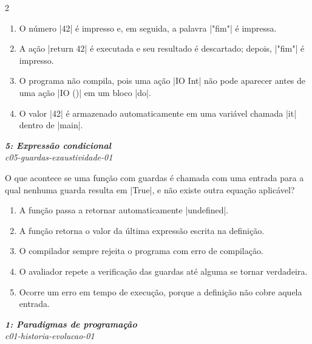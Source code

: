 \documentclass[a4paper,10pt,brazil]{article}
\begin{document}
\begin{multicols}{2}
\begin{enumerate}
  \item O número \haskellinline|42| é impresso e, em seguida, a palavra \haskellinline|"fim"| é impressa.

  \item A ação \haskellinline|return 42| é executada e seu resultado é descartado; depois, \haskellinline|"fim"| é impresso.

  \item O programa não compila, pois uma ação \haskellinline|IO Int| não pode aparecer antes de uma ação \haskellinline|IO ()| em um bloco \haskellinline|do|.

  \item O valor \haskellinline|42| é armazenado automaticamente em uma variável chamada \haskellinline|it| dentro de \haskellinline|main|.


\end{enumerate}

\begin{flushright}
  \footnotesize
  \textit{\textbf{5: Expressão condicional}}\\
  \textit{c05-guardas-exaustividade-01}\\

\end{flushright}
O que acontece se uma função com guardas é chamada com uma entrada para a qual nenhuma guarda resulta em \haskellinline|True|, e não existe outra equação aplicável?

\begin{enumerate}
  \item A função passa a retornar automaticamente \haskellinline|undefined|.

  \item A função retorna o valor da última expressão escrita na definição.

  \item O compilador sempre rejeita o programa com erro de compilação.

  \item O avaliador repete a verificação das guardas até alguma se tornar verdadeira.

  \item Ocorre um erro em tempo de execução, porque a definição não cobre aquela entrada.


\end{enumerate}

\begin{flushright}
  \footnotesize
  \textit{\textbf{1: Paradigmas de programação}}\\
  \textit{c01-historia-evolucao-01}\\


\end{flushright}
\end{multicols}
\end{document}
